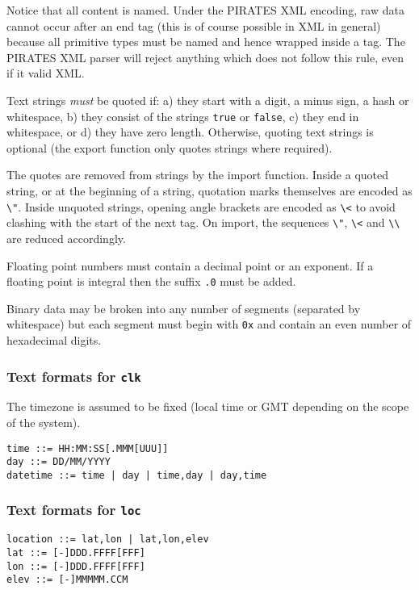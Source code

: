 \documentclass[12pt,a4paper,twoside]{article}
\renewcommand{\_}{\texttt{\symbol{95}}}
\begin{document}
Notice that all content is named. Under the PIRATES XML encoding,
raw data cannot occur after an end tag (this is of course
possible in XML in general) because all primitive types must
be named and hence wrapped inside a tag. The PIRATES XML parser
will reject anything which does not follow this rule,
even if it valid XML.

Text strings \textit{must} be quoted if: a) they start with
a digit, a minus sign, a hash or whitespace, b) they
consist of the strings \verb^true^ or \verb^false^,
c) they end in whitespace, or d) they have zero length.
Otherwise, quoting text strings is optional (the
export function only quotes strings where required).

The quotes are removed from strings by the import function.
Inside a quoted string, or at the beginning of a string,
quotation marks themselves are
encoded as \verb^\"^. Inside unquoted strings, opening
angle brackets are encoded as \verb^\<^ to avoid clashing
with the start of the next tag. On import, the sequences
\verb^\"^, \verb^\<^ and \verb^\\^ are reduced accordingly.

Floating point numbers must contain a decimal point
or an exponent. If a floating point is integral then the
suffix \verb^.0^ must be added.

Binary data may be broken into any number of segments
(separated by whitespace) but each segment must begin with
\verb^0x^ and contain an even number of hexadecimal digits.

\subsubsection*{Text formats for \texttt{clk}}

The timezone is assumed to be fixed (local time or GMT depending on
the scope of the system).

\begin{verbatim}
time ::= HH:MM:SS[.MMM[UUU]]
day ::= DD/MM/YYYY
datetime ::= time | day | time,day | day,time
\end{verbatim}

\subsubsection*{Text formats for \texttt{loc}}

\begin{verbatim}
location ::= lat,lon | lat,lon,elev
lat ::= [-]DDD.FFFF[FFF]
lon ::= [-]DDD.FFFF[FFF]
elev ::= [-]MMMMM.CCM
\end{verbatim}
\end{document}
